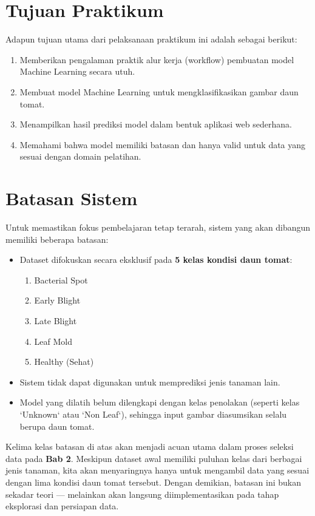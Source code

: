\section{Tujuan Praktikum}
Adapun tujuan utama dari pelaksanaan praktikum ini adalah sebagai berikut:
\begin{enumerate}
    \item Memberikan pengalaman praktik alur kerja (workflow) pembuatan model Machine Learning secara utuh.
    \item Membuat model Machine Learning untuk mengklasifikasikan gambar daun tomat.
    \item Menampilkan hasil prediksi model dalam bentuk aplikasi web sederhana.
    \item Memahami bahwa model memiliki batasan dan hanya valid untuk data yang sesuai dengan domain pelatihan.
\end{enumerate}

\section{Batasan Sistem}
Untuk memastikan fokus pembelajaran tetap terarah, sistem yang akan dibangun memiliki beberapa batasan:
\begin{itemize}
    \item Dataset difokuskan secara eksklusif pada \textbf{5 kelas kondisi daun tomat}:
    \begin{enumerate}
        \item Bacterial Spot
        \item Early Blight
        \item Late Blight
        \item Leaf Mold
        \item Healthy (Sehat)
    \end{enumerate}
    \item Sistem tidak dapat digunakan untuk memprediksi jenis tanaman lain.
    \item Model yang dilatih belum dilengkapi dengan kelas penolakan (seperti kelas `Unknown` atau `Non Leaf`), sehingga input gambar diasumsikan selalu berupa daun tomat.
\end{itemize}

Kelima kelas batasan di atas akan menjadi acuan utama dalam proses seleksi data pada \textbf{Bab 2}. Meskipun dataset awal memiliki puluhan kelas dari berbagai jenis tanaman, kita akan menyaringnya hanya untuk mengambil data yang sesuai dengan lima kondisi daun tomat tersebut. Dengan demikian, batasan ini bukan sekadar teori --- melainkan akan langsung diimplementasikan pada tahap eksplorasi dan persiapan data.

